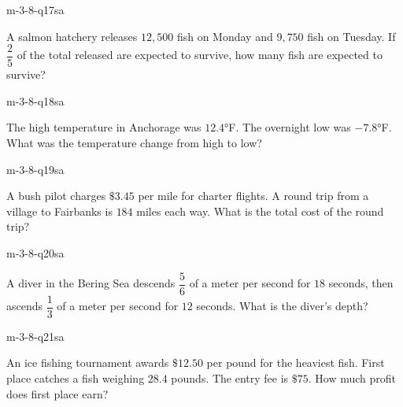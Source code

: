 \begin{practiceQuestion}{m-3-8-q17}{sa}
\begin{questionText}
A salmon hatchery releases $12{,}500$ fish on Monday and $9{,}750$ fish on Tuesday. If $\dfrac{2}{5}$ of the total released are expected to survive, how many fish are expected to survive?
\end{questionText}
\end{practiceQuestion}

\begin{practiceQuestion}{m-3-8-q18}{sa}
\begin{questionText}
The high temperature in Anchorage was $12.4°$F. The overnight low was $-7.8°$F. What was the temperature change from high to low?
\end{questionText}
\end{practiceQuestion}

\begin{practiceQuestion}{m-3-8-q19}{sa}
\begin{questionText}
A bush pilot charges $\$3.45$ per mile for charter flights. A round trip from a village to Fairbanks is $184$ miles each way. What is the total cost of the round trip?
\end{questionText}
\end{practiceQuestion}

\begin{practiceQuestion}{m-3-8-q20}{sa}
\begin{questionText}
A diver in the Bering Sea descends $\dfrac{5}{6}$ of a meter per second for $18$ seconds, then ascends $\dfrac{1}{3}$ of a meter per second for $12$ seconds. What is the diver's depth?
\end{questionText}
\end{practiceQuestion}

\begin{practiceQuestion}{m-3-8-q21}{sa}
\begin{questionText}
An ice fishing tournament awards $\$12.50$ per pound for the heaviest fish. First place catches a fish weighing $28.4$ pounds. The entry fee is $\$75$. How much profit does first place earn?
\end{questionText}
\end{practiceQuestion}

